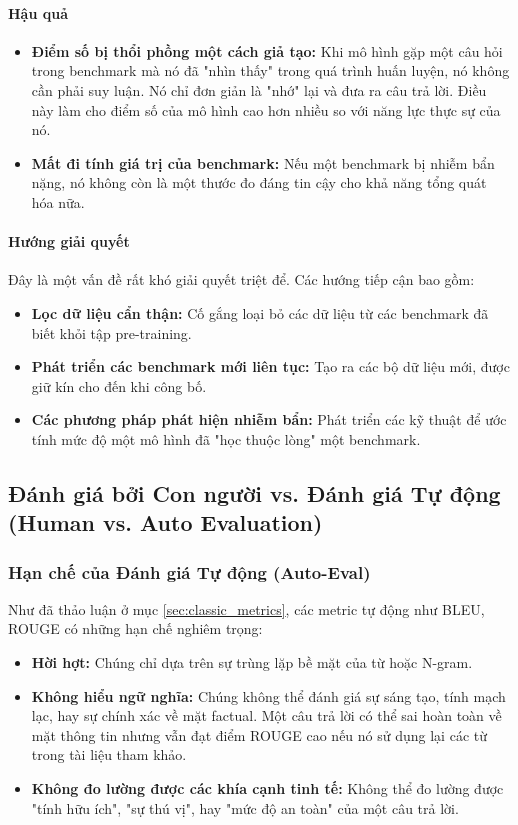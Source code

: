 \paragraph{Hậu quả}
\begin{itemize}
    \item \textbf{Điểm số bị thổi phồng một cách giả tạo:} Khi mô hình gặp một câu hỏi trong benchmark mà nó đã "nhìn thấy" trong quá trình huấn luyện, nó không cần phải suy luận. Nó chỉ đơn giản là "nhớ" lại và đưa ra câu trả lời. Điều này làm cho điểm số của mô hình cao hơn nhiều so với năng lực thực sự của nó.
    \item \textbf{Mất đi tính giá trị của benchmark:} Nếu một benchmark bị nhiễm bẩn nặng, nó không còn là một thước đo đáng tin cậy cho khả năng tổng quát hóa nữa.
\end{itemize}

\paragraph{Hướng giải quyết}
Đây là một vấn đề rất khó giải quyết triệt để. Các hướng tiếp cận bao gồm:
\begin{itemize}
    \item \textbf{Lọc dữ liệu cẩn thận:} Cố gắng loại bỏ các dữ liệu từ các benchmark đã biết khỏi tập pre-training.
    \item \textbf{Phát triển các benchmark mới liên tục:} Tạo ra các bộ dữ liệu mới, được giữ kín cho đến khi công bố.
    \item \textbf{Các phương pháp phát hiện nhiễm bẩn:} Phát triển các kỹ thuật để ước tính mức độ một mô hình đã "học thuộc lòng" một benchmark.
\end{itemize}

\subsection{Đánh giá bởi Con người vs. Đánh giá Tự động (Human vs. Auto Evaluation)}
\label{ssec:human_vs_auto_eval}

\subsubsection{Hạn chế của Đánh giá Tự động (Auto-Eval)}
Như đã thảo luận ở mục \ref{sec:classic_metrics}, các metric tự động như BLEU, ROUGE có những hạn chế nghiêm trọng:
\begin{itemize}
    \item \textbf{Hời hợt:} Chúng chỉ dựa trên sự trùng lặp bề mặt của từ hoặc N-gram.
    \item \textbf{Không hiểu ngữ nghĩa:} Chúng không thể đánh giá sự sáng tạo, tính mạch lạc, hay sự chính xác về mặt factual. Một câu trả lời có thể sai hoàn toàn về mặt thông tin nhưng vẫn đạt điểm ROUGE cao nếu nó sử dụng lại các từ trong tài liệu tham khảo.
    \item \textbf{Không đo lường được các khía cạnh tinh tế:} Không thể đo lường được "tính hữu ích", "sự thú vị", hay "mức độ an toàn" của một câu trả lời.
\end{itemize}

